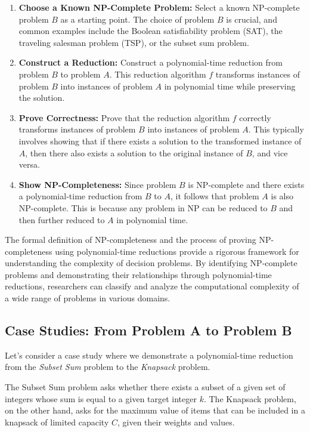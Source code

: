 \documentclass[12pt]{book} %
\begin{document}
\begin{enumerate}
    \item \textbf{Choose a Known NP-Complete Problem:} Select a known NP-complete problem \(B\) as a starting point. The choice of problem \(B\) is crucial, and common examples include the Boolean satisfiability problem (SAT), the traveling salesman problem (TSP), or the subset sum problem.
    
    \item \textbf{Construct a Reduction:} Construct a polynomial-time reduction from problem \(B\) to problem \(A\). This reduction algorithm \(f\) transforms instances of problem \(B\) into instances of problem \(A\) in polynomial time while preserving the solution.
    
    \item \textbf{Prove Correctness:} Prove that the reduction algorithm \(f\) correctly transforms instances of problem \(B\) into instances of problem \(A\). This typically involves showing that if there exists a solution to the transformed instance of \(A\), then there also exists a solution to the original instance of \(B\), and vice versa.
    
    \item \textbf{Show NP-Completeness:} Since problem \(B\) is NP-complete and there exists a polynomial-time reduction from \(B\) to \(A\), it follows that problem \(A\) is also NP-complete. This is because any problem in NP can be reduced to \(B\) and then further reduced to \(A\) in polynomial time.
\end{enumerate}

The formal definition of NP-completeness and the process of proving NP-completeness using polynomial-time reductions provide a rigorous framework for understanding the complexity of decision problems. By identifying NP-complete problems and demonstrating their relationships through polynomial-time reductions, researchers can classify and analyze the computational complexity of a wide range of problems in various domains.

\subsection{Case Studies: From Problem A to Problem B}

Let's consider a case study where we demonstrate a polynomial-time reduction from the \textit{Subset Sum} problem to the \textit{Knapsack} problem.

The Subset Sum problem asks whether there exists a subset of a given set of integers whose sum is equal to a given target integer \(k\). The Knapsack problem, on the other hand, asks for the maximum value of items that can be included in a knapsack of limited capacity \(C\), given their weights and values.
\end{document}
